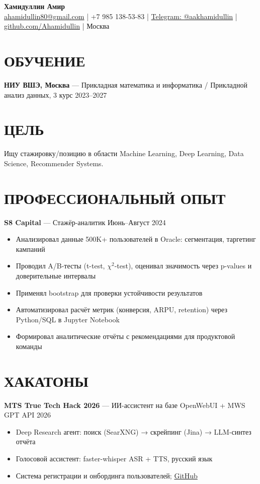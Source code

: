 \documentclass[10pt,a4paper]{article}
\begin{document}
\begin{center}
    {\Huge \textbf{Хамидуллин Амир}} \\[3pt]
    \small
    \href{mailto:ahamidullin80@gmail.com}{ahamidullin80@gmail.com} | 
    +7 985 138-53-83 | 
    \href{https://t.me/aakhamidullin}{Telegram: @aakhamidullin} | 
    \href{https://github.com/Ahamidullin}{github.com/Ahamidullin} | 
    Москва
\end{center}


\section{ОБУЧЕНИЕ}
\textbf{НИУ ВШЭ, Москва} — Прикладная математика и информатика / Прикладной анализ данных, 3 курс \hfill 2023–2027

\section{ЦЕЛЬ}
Ищу стажировку/позицию в области Machine Learning, Deep Learning, Data Science, Recommender Systems. 

\section{ПРОФЕССИОНАЛЬНЫЙ ОПЫТ}
\textbf{S8 Capital} — Стажёр-аналитик \hfill Июнь–Август 2024
\begin{itemize}[left=0pt, itemsep=1pt]
    \item Анализировал данные 500K+ пользователей в Oracle: сегментация, таргетинг кампаний
    \item Проводил A/B-тесты (t-test, $\chi^2$-test), оценивал значимость через p-values и доверительные интервалы
    \item Применял bootstrap для проверки устойчивости результатов
    \item Автоматизировал расчёт метрик (конверсия, ARPU, retention) через Python/SQL в Jupyter Notebook
    \item Формировал аналитические отчёты с рекомендациями для продуктовой команды
\end{itemize}


\section{ХАКАТОНЫ}

\textbf{MTS True Tech Hack 2026} — ИИ-ассистент на базе OpenWebUI + MWS GPT API \hfill 2026
\begin{itemize}[left=0pt, itemsep=1pt]
    \item Deep Research агент: поиск (SearXNG) → скрейпинг (Jina) → LLM-синтез отчёта
    \item Голосовой ассистент: faster-whisper ASR + TTS, русский язык
    \item Система регистрации и онбординга пользователей; \href{https://github.com/hihihahovka/mts-hack}{GitHub}
\end{itemize}
\end{document}
